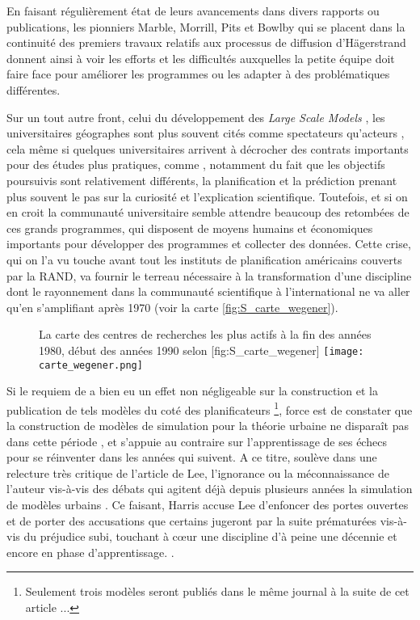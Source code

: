 En faisant régulièrement état de leurs avancements dans divers rapports ou publications, les pionniers Marble, Morrill, Pits et Bowlby \autocite{Pitts1963} qui se placent dans la continuité des premiers travaux relatifs aux processus de diffusion d'Hägerstrand \autocite{Hagerstrand1953, Hagerstrand1967a} donnent ainsi à voir les efforts et les difficultés auxquelles la petite équipe doit faire face pour améliorer les programmes ou les adapter à des problématiques différentes.

Sur un tout autre front, celui du développement des \textit{Large Scale Models} \autocites[8]{Batty1976}, les universitaires géographes sont plus souvent cités comme spectateurs qu'acteurs \autocites[9]{Batty1994}[153]{Batty1989}, cela même si quelques universitaires arrivent à décrocher des contrats importants \autocite{Barnes2006a} pour des études plus pratiques, comme \textcite{Garrison1959}, notamment du fait que les objectifs poursuivis sont relativement différents, la planification et la prédiction prenant plus souvent le pas sur la curiosité et l'explication scientifique. Toutefois, et si on en croit \textcite{Haggett1969} la communauté universitaire semble attendre beaucoup des retombées de ces grands programmes, qui disposent de moyens humains et économiques importants pour développer des programmes et collecter des données. Cette crise, qui on l'a vu touche avant tout les instituts de planification américains couverts par la RAND, va fournir le terreau nécessaire à la transformation d'une discipline dont le rayonnement dans la communauté scientifique à l'international ne va aller qu'en s'amplifiant après 1970 (voir la carte \ref{fig:S_carte_wegener}).

\begin{figure}[h]
\begin{sidecaption}[fortoc]{La carte des centres de recherches les plus actifs à la fin des années 1980, début des années 1990 selon \textcite{Wegener1994}}[fig:S_carte_wegener]
  \centering
 \texttt{[image: carte\_wegener.png]}
  \end{sidecaption}
\end{figure}

Si le requiem de \textcite{Lee1973} a bien eu un effet non négligeable sur la construction et la publication de tels modèles du coté des planificateurs \footnote{Seulement trois modèles seront publiés dans le même journal à la suite de cet article ...}, force est de constater que la construction de modèles de simulation pour la théorie urbaine ne disparaît pas dans cette période \autocite[11-12]{Batty1994}, et s'appuie au contraire sur l'apprentissage de ses échecs pour se réinventer dans les années qui suivent. A ce titre, \textcite{Harris1994} soulève dans une relecture très critique de l'article de Lee, l'ignorance ou la méconnaissance de l'auteur vis-à-vis des débats qui agitent déjà depuis plusieurs années la simulation de modèles urbains \autocites{Batty1971, Wilson1970, Orcutt1957, Harris1968}. Ce faisant, Harris accuse Lee d'enfoncer des portes ouvertes et de porter des accusations que certains jugeront par la suite prématurées vis-à-vis du préjudice subi, touchant à cœur une discipline d'à peine une décennie et encore en phase d'apprentissage. \autocite[p11]{Batty1994}.

